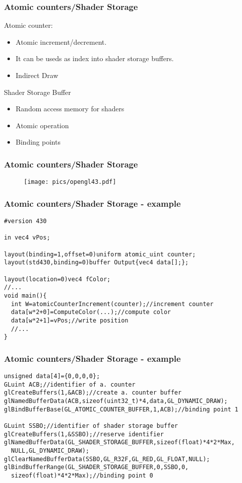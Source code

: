 \begin{frame}
\frametitle{Atomic counters/Shader Storage}
	Atomic counter:
	\begin{itemize}
	\item Atomic increment/decrement.
	\item It can be useds as index into shader storage buffers.
	\item Indirect Draw
	\end{itemize}
	Shader Storage Buffer
	\begin{itemize}
	\item Random access memory for shaders
	\item Atomic operation
	\item Binding points
	\end{itemize}
\end{frame}

\begin{frame}
\frametitle{Atomic counters/Shader Storage}
	\begin{figure}[h]
	\texttt{[image: pics/opengl43.pdf]}
	\end{figure}
\end{frame}

\begin{frame}[fragile]
\frametitle{Atomic counters/Shader Storage - example}
	{\scriptsize
	\begin{verbatim}
#version 430

in vec4 vPos;

layout(binding=1,offset=0)uniform atomic_uint counter;
layout(std430,binding=0)buffer Output{vec4 data[];};

layout(location=0)vec4 fColor;
//...
void main(){
  int W=atomicCounterIncrement(counter);//increment counter
  data[w*2+0]=ComputeColor(...);//compute color
  data[w*2+1]=vPos;//write position
  //...
}
	\end{verbatim}
	}
\end{frame}

\begin{frame}[fragile]
\frametitle{Atomic counters/Shader Storage - example}
	{\scriptsize
	\begin{verbatim}
unsigned data[4]={0,0,0,0};
GLuint ACB;//identifier of a. counter
glCreateBuffers(1,&ACB);//create a. counter buffer
glNamedBufferData(ACB,sizeof(uint32_t)*4,data,GL_DYNAMIC_DRAW);
glBindBufferBase(GL_ATOMIC_COUNTER_BUFFER,1,ACB);//binding point 1

GLuint SSBO;//identifier of shader storage buffer
glCreateBuffers(1,&SSBO);//reserve identifier
glNamedBufferData(GL_SHADER_STORAGE_BUFFER,sizeof(float)*4*2*Max,
  NULL,GL_DYNAMIC_DRAW);
glClearNamedBufferData(SSBO,GL_R32F,GL_RED,GL_FLOAT,NULL);
glBindBufferRange(GL_SHADER_STORAGE_BUFFER,0,SSBO,0,
  sizeof(float)*4*2*Max);//binding point 0
	\end{verbatim}
	}
\end{frame}

